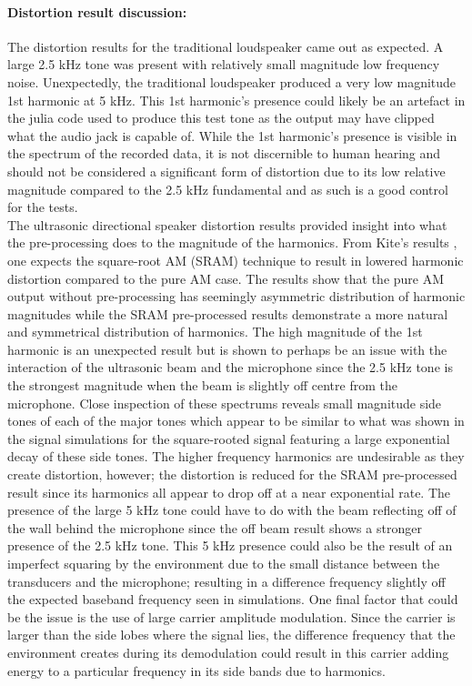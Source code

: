 \paragraph{Distortion result discussion:}
The distortion results for the traditional loudspeaker came out as expected. A large 2.5 kHz tone was present with relatively small magnitude low frequency noise. Unexpectedly, the traditional loudspeaker produced a very low magnitude 1st harmonic at 5 kHz. This 1st harmonic's presence could likely be an artefact in the julia code used to produce this test tone as the output may have clipped what the audio jack is capable of. While the 1st harmonic's presence is visible in the spectrum of the recorded data, it is not discernible to human hearing and should not be considered a significant form of distortion due to its low relative magnitude compared to the 2.5 kHz fundamental and as such is a good control for the tests.\\
The ultrasonic directional speaker distortion results provided insight into what the pre-processing does to the magnitude of the harmonics. From Kite's results \cite{kite_post_hamilton_1998}, one expects the square-root AM (SRAM) technique to result in lowered harmonic distortion compared to the pure AM case. The results show that the pure AM output without pre-processing has seemingly asymmetric distribution of harmonic magnitudes while the SRAM pre-processed results demonstrate a more natural and symmetrical distribution of harmonics. The high magnitude of the 1st harmonic is an unexpected result but is shown to perhaps be an issue with the interaction of the ultrasonic beam and the microphone since the 2.5 kHz tone is the strongest magnitude when the beam is slightly off centre from the microphone. Close inspection of these spectrums reveals small magnitude side tones of each of the major tones which appear to be similar to what was shown in the signal simulations for the square-rooted signal featuring a large exponential decay of these side tones. The higher frequency harmonics are undesirable as they create distortion, however; the distortion is reduced for the SRAM pre-processed result since its harmonics all appear to drop off at a near exponential rate. The presence of the large 5 kHz tone could have to do with the beam reflecting off of the wall behind the microphone since the off beam result shows a stronger presence of the 2.5 kHz tone. This 5 kHz presence could also be the result of an imperfect squaring by the environment due to the small distance between the transducers and the microphone; resulting in a difference frequency slightly off the expected baseband frequency seen in simulations. One final factor that could be the issue is the use of large carrier amplitude modulation. Since the carrier is larger than the side lobes where the signal lies, the difference frequency that the environment creates during its demodulation could result in this carrier adding energy to a particular frequency in its side bands due to harmonics.\\
